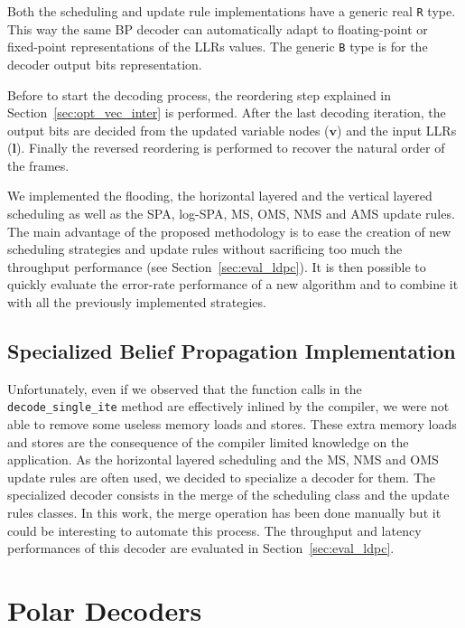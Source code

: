 Both the scheduling and update rule implementations have a generic real
\verb|R| type. This way the same BP decoder can automatically adapt to
floating-point or fixed-point representations of the LLRs values. The generic
\verb|B| type is for the decoder output bits representation.

Before to start the decoding process, the reordering step explained in
Section~\ref{sec:opt_vec_inter} is performed. After the last decoding
iteration, the output bits are decided from the updated variable nodes
($\bm{v}$) and the input LLRs ($\bm{l}$). Finally the reversed reordering is
performed to recover the natural order of the frames.

We implemented the flooding, the horizontal layered and the vertical layered
scheduling as well as the SPA, log-SPA, MS, OMS, NMS and AMS update rules.
The main advantage of the proposed methodology is to ease the creation of new
scheduling strategies and update rules without sacrificing too much the
throughput performance (see Section~\ref{sec:eval_ldpc}). It is then possible to
quickly evaluate the error-rate performance of a new algorithm and to combine it
with all the previously implemented strategies.

\subsection{Specialized Belief Propagation Implementation}
\label{sec:opt_ldpc_spe_bphlnms}

Unfortunately, even if we observed that the function calls in the
\verb|decode_single_ite| method are effectively inlined by the compiler, we were
not able to remove some useless memory loads and stores. These extra memory
loads and stores are the consequence of the compiler limited knowledge on the
application. As the horizontal layered scheduling and the MS, NMS and OMS update
rules are often used, we decided to specialize a decoder for them. The
specialized decoder consists in the merge of the scheduling class and the update
rules classes. In this work, the merge operation has been done manually but it
could be interesting to automate this process. The throughput and latency
performances of this decoder are evaluated in Section~\ref{sec:eval_ldpc}.

\section{Polar Decoders}
\label{sec:opt_polar}

